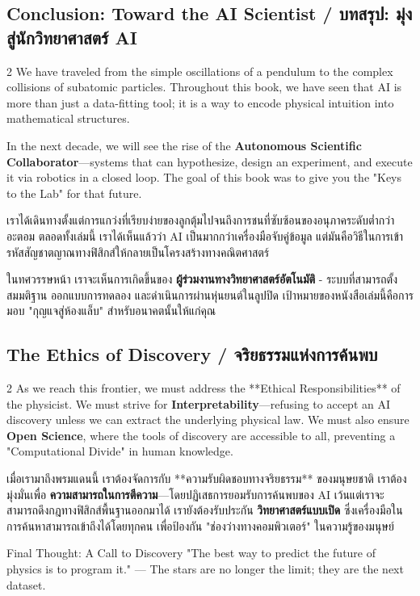 \subsection{Conclusion: Toward the AI Scientist \quad / \quad \textthai{บทสรุป: มุ่งสู่นักวิทยาศาสตร์ AI}}
\begin{paracol}{2}
We have traveled from the simple oscillations of a pendulum to the complex collisions of subatomic particles. Throughout this book, we have seen that AI is more than just a data-fitting tool; it is a way to encode physical intuition into mathematical structures.

In the next decade, we will see the rise of the \textbf{Autonomous Scientific Collaborator}—systems that can hypothesize, design an experiment, and execute it via robotics in a closed loop. The goal of this book was to give you the "Keys to the Lab" for that future.

\switchcolumn

\begin{thai}
เราได้เดินทางตั้งแต่การแกว่งที่เรียบง่ายของลูกตุ้มไปจนถึงการชนที่ซับซ้อนของอนุภาคระดับต่ำกว่าอะตอม ตลอดทั้งเล่มนี้ เราได้เห็นแล้วว่า AI เป็นมากกว่าเครื่องมือจับคู่ข้อมูล แต่มันคือวิธีในการเข้ารหัสสัญชาตญาณทางฟิสิกส์ให้กลายเป็นโครงสร้างทางคณิตศาสตร์

ในทศวรรษหน้า เราจะเห็นการเกิดขึ้นของ \textbf{ผู้ร่วมงานทางวิทยาศาสตร์อัตโนมัติ} - ระบบที่สามารถตั้งสมมติฐาน ออกแบบการทดลอง และดำเนินการผ่านหุ่นยนต์ในลูปปิด เป้าหมายของหนังสือเล่มนี้คือการมอบ "กุญแจสู่ห้องแล็บ" สำหรับอนาคตนั้นให้แก่คุณ
\end{thai}
\end{paracol}

\subsection{The Ethics of Discovery \quad / \quad \textthai{จริยธรรมแห่งการค้นพบ}}
\begin{paracol}{2}
As we reach this frontier, we must address the **Ethical Responsibilities** of the physicist. We must strive for \textbf{Interpretability}—refusing to accept an AI discovery unless we can extract the underlying physical law. We must also ensure \textbf{Open Science}, where the tools of discovery are accessible to all, preventing a "Computational Divide" in human knowledge.

\switchcolumn

\begin{thai}
เมื่อเรามาถึงพรมแดนนี้ เราต้องจัดการกับ **ความรับผิดชอบทางจริยธรรม** ของมนุษยชาติ เราต้องมุ่งมั่นเพื่อ \textbf{ความสามารถในการตีความ}—โดยปฏิเสธการยอมรับการค้นพบของ AI เว้นแต่เราจะสามารถดึงกฎทางฟิสิกส์พื้นฐานออกมาได้ เรายังต้องรับประกัน \textbf{วิทยาศาสตร์แบบเปิด} ซึ่งเครื่องมือในการค้นหาสามารถเข้าถึงได้โดยทุกคน เพื่อป้องกัน "ช่องว่างทางคอมพิวเตอร์" ในความรู้ของมนุษย์
\end{thai}
\end{paracol}

\begin{aibox}{Final Thought: A Call to Discovery}
"The best way to predict the future of physics is to program it." — The stars are no longer the limit; they are the next dataset.
\end{aibox}
